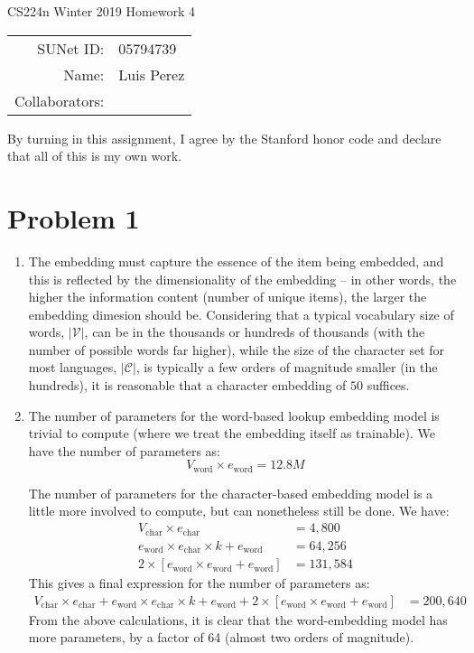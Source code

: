 \documentclass[12pt]{article}
\begin{document}
\begin{center}
{\Large CS224n Winter 2019 Homework 4}

\begin{tabular}{rl}
SUNet ID: & 05794739 \\
Name: & Luis Perez \\
Collaborators: &
\end{tabular}
\end{center}

By turning in this assignment, I agree by the Stanford honor code and declare
that all of this is my own work.

\section*{Problem 1}
\begin{enumerate}[label=(\alph*)]
  \item The embedding must capture the essence of the item being embedded, and this is reflected by the dimensionality of the embedding -- in other words, the higher the information content (number of unique items), the larger the embedding dimesion should be. Considering that a typical vocabulary size of words, $|\mathcal{V}|$, can be in the thousands or hundreds of thousands (with the number of possible words far higher), while the size of the character set for most languages, $|\mathcal{C}|$, is typically a few orders of magnitude smaller (in the hundreds), it is reasonable that a character embedding of $50$ suffices.
  \item The number of parameters for the word-based lookup embedding model is trivial to compute (where we treat the embedding itself as trainable). We have the number of parameters as:
  $$
    V_{\text{word}} \times e_{\text{word}} = 12.8M
  $$

  The number of parameters for the character-based embedding model is a little more involved to compute, but can nonetheless still be done. We have:
  \begin{align*}
    V_{\text{char}} \times e_{\text{char}} &= 4,800 \tag{Character Embedding Parameters} \\
    e_{\text{word}} \times e_{\text{char}} \times k + e_{\text{word}}  &= 64,256 \tag{Convolution Parameters} \\
    2 \times [e_{\text{word}} \times e_{\text{word}} + e_{\text{word}}] &= 131,584 \tag{Highway Network Parameters}
  \end{align*}
  This gives a final expression for the number of parameters as:
  \begin{align*}
    V_{\text{char}} \times e_{\text{char}} + e_{\text{word}} \times e_{\text{char}} \times k + e_{\text{word}} + 2 \times [e_{\text{word}} \times e_{\text{word}} + e_{\text{word}}]  &= 200,640
  \end{align*}
  From the above calculations, it is clear that the word-embedding model has more parameters, by a factor of 64 (almost two orders of magnitude).
\end{enumerate}
\end{document}

